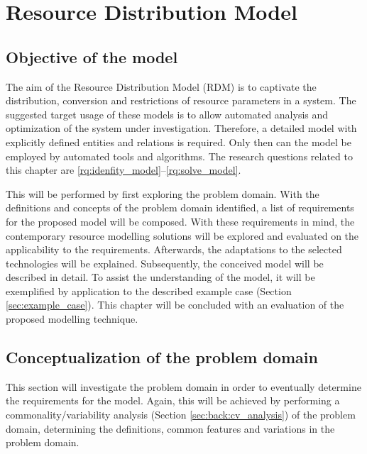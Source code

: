  

\newcommand{\rdmid}{2}
\chapter{Resource Distribution Model}
\label{ch:rdm}
\section{Objective of the model}
The aim of the Resource Distribution Model (RDM) is to captivate the distribution, conversion and restrictions of resource parameters in a system. The suggested target usage of these models is to allow automated analysis and optimization of the system under investigation. Therefore, a detailed model with explicitly defined entities and relations is required. Only then can the model be employed by automated tools and algorithms. The research questions related to this chapter are \ref{rq:idenfity_model}--\ref{rq:solve_model}.

This will be performed by first exploring the problem domain. With the definitions and concepts of the problem domain identified, a list of requirements for the proposed model will be composed. With these requirements in mind, the contemporary resource modelling solutions will be explored and evaluated on the applicability to the requirements. Afterwards, the adaptations to the selected technologies will be explained. Subsequently, the conceived model will be described in detail. To assist the understanding of the model, it will be exemplified by application to the described example case (Section \ref{sec:example_case}). This chapter will be concluded with an evaluation of the proposed modelling technique.

\section{Conceptualization of the problem domain}
\label{sec:cv_analysis}
This section will investigate the problem domain in order to eventually determine the requirements for the model. Again, this will be achieved by performing a commonality/variability analysis (Section \ref{sec:back:cv_analysis}) of the problem domain, determining the definitions, common features and variations in the problem domain.

